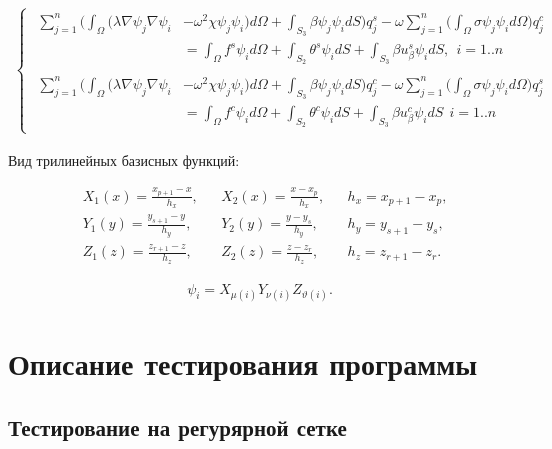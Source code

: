 \documentclass[12pt]{article}
\begin{document}
\begin{align}
  \begin{cases}
    \begin{split}
      \sum_{j=1}^{n}\bigg(
        \int_{\Omega}(\lambda\nabla \psi_j \nabla \psi_i & - \omega^2\chi\psi_j\psi_i)d\Omega +
        \int_{S_3}\beta\psi_j\psi_i dS\bigg
      )q^s_j - \omega\sum_{j=1}^{n}\bigg(\int_{\Omega}\sigma\psi_j\psi_i d\Omega\bigg)q^c_j \\
      & = \int_{\Omega}f^s \psi_i d\Omega +
          \int_{S_2}\theta^s \psi_i dS +
          \int_{S_3}\beta u^s_{\beta} \psi_i dS,\ \ i=1..n
    \end{split} \\
    \begin{split}
      \sum_{j=1}^{n}\bigg(
        \int_{\Omega}(\lambda\nabla \psi_j \nabla \psi_i & - \omega^2\chi\psi_j\psi_i)d\Omega +
        \int_{S_3}\beta\psi_j\psi_i dS\bigg
      )q^c_j - \omega\sum_{j=1}^{n}\bigg(\int_{\Omega}\sigma\psi_j\psi_i d\Omega\bigg)q^s_j \\
      & = \int_{\Omega}f^c \psi_i d\Omega +
          \int_{S_2}\theta^c \psi_i dS +
          \int_{S_3}\beta u^c_{\beta} \psi_i dS\ \ i=1..n
    \end{split}
  \end{cases}
\end{align}

\vskip 5mm
\noindent Вид трилинейных базисных функций:

\begin{align*}
  & X_1(x) = \frac{x_{p+1}-x}{h_x}, & &X_2(x) = \frac{x - x_{p}}{h_x}, & &h_x = x_{p+1} - x_p, \\
  & Y_1(y) = \frac{y_{s+1}-y}{h_y}, & &Y_2(y) = \frac{y - y_{s}}{h_y}, & &h_y = y_{s+1} - y_s, \\
  & Z_1(z) = \frac{z_{r+1}-z}{h_z}, & &Z_2(z) = \frac{z - z_{r}}{h_z}, & &h_z = z_{r+1} - z_r.
\end{align*}

\begin{align}
  \psi_i = X_{\mu(i)}Y_{\nu(i)}Z_{\vartheta(i)}.
\end{align}

\section{Описание тестирования программы}

\subsection{Тестирование на регурярной сетке}
\end{document}
